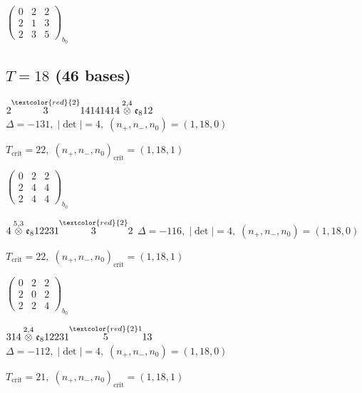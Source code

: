 \documentclass[10pt]{article}
\begin{document}
\hspace{2em}$\left(\begin{smallmatrix}0 & 2 & 2 \\ 2 & 1 & 3 \\ 2 & 3 & 5\end{smallmatrix}\right)_{\!b_0}$


\subsection*{$T = 18$ \quad (46 bases)}
\smallskip

$2\overset{\textcolor{red}{2}}{3}14141414\overset{2,4}{\otimes}\mathfrak{e}_812$ \quad $\Delta=-131,\; |\det|=4,\; (n_+,n_-,n_0)=(1,18,0)$

\hspace{1em}$T_{\text{crit}}=22,\; (n_+,n_-,n_0)_{\text{crit}}=(1,18,1)$

\hspace{2em}$\left(\begin{smallmatrix}0 & 2 & 2 \\ 2 & 4 & 4 \\ 2 & 4 & 4\end{smallmatrix}\right)_{\!b_0}$

\smallskip

$4\overset{5,3}{\otimes}\mathfrak{e}_812231\overset{\textcolor{red}{2}}{3}2$ \quad $\Delta=-116,\; |\det|=4,\; (n_+,n_-,n_0)=(1,18,0)$

\hspace{1em}$T_{\text{crit}}=22,\; (n_+,n_-,n_0)_{\text{crit}}=(1,18,1)$

\hspace{2em}$\left(\begin{smallmatrix}0 & 2 & 2 \\ 2 & 0 & 2 \\ 2 & 2 & 4\end{smallmatrix}\right)_{\!b_0}$

\smallskip

$314\overset{2,4}{\otimes}\mathfrak{e}_812231\overset{\textcolor{red}{2}1}{5}13$ \quad $\Delta=-112,\; |\det|=4,\; (n_+,n_-,n_0)=(1,18,0)$

\hspace{1em}$T_{\text{crit}}=21,\; (n_+,n_-,n_0)_{\text{crit}}=(1,18,1)$
\end{document}
